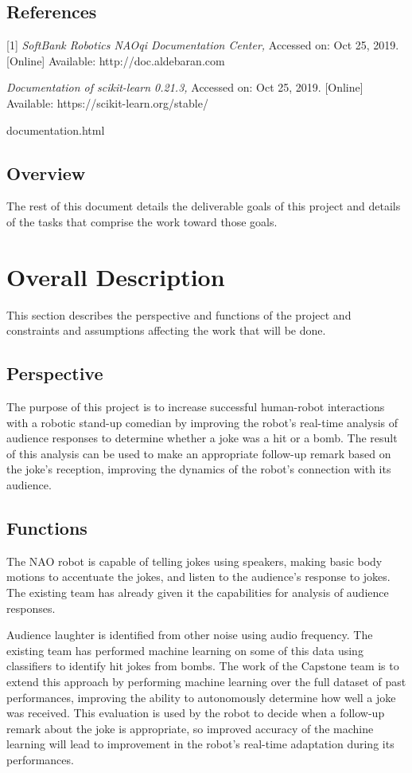 \documentclass[onecolumn, draftclsnofoot,10pt, compsoc]{IEEEtran}
\begin{document}
\subsection{References}
[1] \textit{SoftBank Robotics NAOqi Documentation Center,} Accessed on: Oct 25, 2019. [Online] Available: http://doc.aldebaran.com\par
\noindent [2] \textit{Documentation of scikit-learn 0.21.3,} Accessed on: Oct 25, 2019. [Online] Available: https://scikit-learn.org/stable/\par
documentation.html
\subsection{Overview}
The rest of this document details the deliverable goals of this project and details of the tasks that comprise the work toward those goals.

\section{Overall Description}
This section describes the perspective and functions of the project and constraints and assumptions affecting the work that will be done.
\subsection{Perspective}
The purpose of this project is to increase successful human-robot interactions with a robotic stand-up comedian by improving the robot's real-time analysis of audience responses to determine whether a joke was a hit or a bomb. The result of this analysis can be used to make an appropriate follow-up remark based on the joke's reception, improving the dynamics of the robot's connection with its audience.
\subsection{Functions}
The NAO robot is capable of telling jokes using speakers, making basic body motions to accentuate the jokes, and listen to the audience's response to jokes. The existing team has already given it the capabilities for analysis of audience responses.\par
\vspace{.4cm}
\noindent Audience laughter is identified from other noise using audio frequency. The existing team has performed machine learning on some of this data using classifiers to identify hit jokes from bombs. The work of the Capstone team is to extend this approach by performing machine learning over the full dataset of past performances, improving the ability to autonomously determine how well a joke was received. This evaluation is used by the robot to decide when a follow-up remark about the joke is appropriate, so improved accuracy of the machine learning will lead to improvement in the robot's real-time adaptation during its performances.
\end{document}
